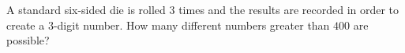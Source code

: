 A standard six-sided die is rolled $3$ times and the results are recorded in order to create a $3$-digit number. How many different numbers greater than $400$ are possible?
